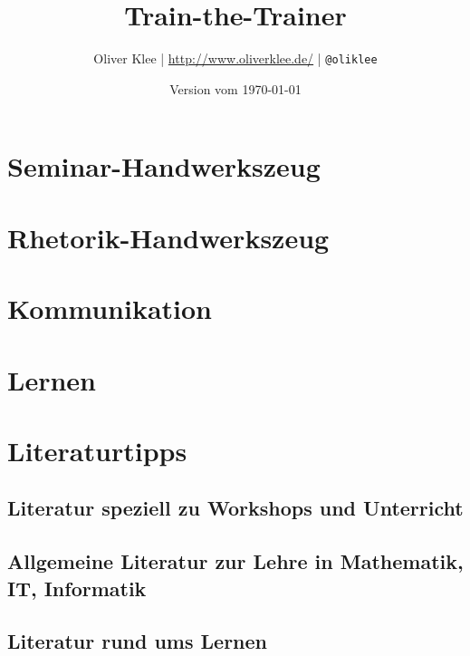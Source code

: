 \documentclass[a4paper,openany,twoside,titlepage,10pt]{scrbook}
\author{Oliver Klee | \url{http://www.oliverklee.de/} | \texttt{@oliklee}}
\title{Train-the-Trainer}
\date{Version vom \today}
\begin{document}
\raggedbottom
\frontmatter

\maketitle

\tableofcontents

\mainmatter

\chapter{Seminar-Handwerkszeug}










\chapter{Rhetorik-Handwerkszeug}




\chapter{Kommunikation}






\chapter{Lernen}












\chapter{Literaturtipps}

\section{Literatur speziell zu Workshops und Unterricht}
\cite{moderationstechniken, visualisieren-praesentieren-moderieren, workshop-buch, treibhaeuser-der-zukunft}

\section{Allgemeine Literatur zur Lehre in Mathematik, IT, Informatik}
\cite{teaching-engineering, red-pen, it-trainer}

\section{Literatur rund ums Lernen}
\cite{denken-lernen-vergessen, lernen-zu-lernen}




\backmatter
\end{document}
